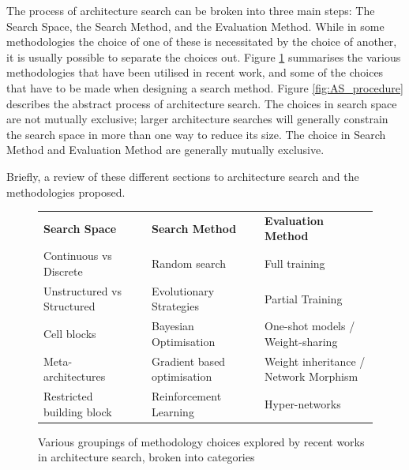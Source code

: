 The process of architecture search can be broken into three main steps: The Search Space, the Search Method, and the Evaluation Method. While in some methodologies the choice of one of these is necessitated by the choice of another, it is usually possible to separate the choices out. Figure \ref{fig:methods} summarises the various methodologies that have been utilised in recent work, and some of the choices that have to be made when designing a search method. Figure \ref{fig:AS_procedure} describes the abstract process of architecture search. The choices in search space are not mutually exclusive; larger architecture searches will generally constrain the search space in more than one way to reduce its size. The choice in Search Method and Evaluation Method are generally mutually exclusive.

Briefly, a review of these different sections to architecture search and the methodologies proposed.

\begin{figure}
	\centering
	{\def\arraystretch{2}
	\begin{tabular}{C{1.5in}cC{1.5in}cC{1.5in}}
		\textbf{Search Space} & \hspace{1cm} & \textbf{Search Method} & \hspace{1cm} & \textbf{Evaluation Method}\\
		  
		Continuous vs Discrete & & Random search & &  Full training\\
		Unstructured vs Structured & & Evolutionary Strategies & & Partial Training \\
		Cell blocks & & Bayesian Optimisation & & One-shot models / Weight-sharing \\
		Meta-architectures & & Gradient based optimisation & & Weight inheritance / Network Morphism\\
		Restricted building block & & Reinforcement Learning & & Hyper-networks
	\end{tabular}
	}
	\caption{Various groupings of methodology choices explored by recent works in architecture search, broken into categories}
	\label{fig:methods}
\end{figure}

